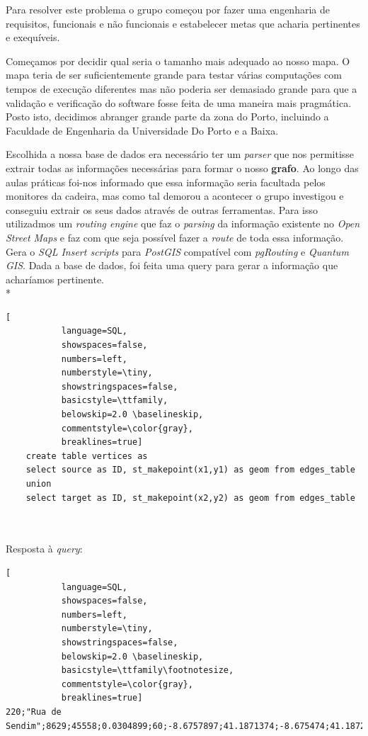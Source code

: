 \documentclass[a4paper]{article}
\begin{document}
\begin{small}

Para resolver este problema o grupo começou por fazer uma engenharia de requisitos, funcionais e não funcionais e estabelecer metas que acharia pertinentes e exequíveis.

Começamos por decidir qual seria o tamanho mais adequado ao nosso mapa. O mapa teria de ser suficientemente grande para testar várias computações com tempos de execução diferentes mas não poderia ser demasiado grande para que a validação e verificação do software fosse feita de uma maneira mais pragmática. Posto isto, decidimos abranger grande parte da zona do Porto, incluindo a Faculdade de Engenharia da Universidade Do Porto e a Baixa. 

Escolhida a nossa base de dados era necessário ter um \textit{parser} que nos permitisse extrair todas as informações necessárias para formar o nosso \textbf{grafo}. Ao longo das aulas práticas foi-nos informado que essa informação seria facultada pelos monitores da cadeira, mas como tal demorou a acontecer o grupo investigou e conseguiu extrair os seus dados através de outras ferramentas. Para isso utilizadmos um \textit{routing engine} que faz o \textit{parsing} da informação existente no \textit{Open Street Maps} e faz com que seja possível fazer a \textit{route} de toda essa informação. Gera o \textit{SQL Insert scripts} para \textit{PostGIS} compatível com \textit{pgRouting} e \textit{Quantum GIS}. Dada a base de dados, foi feita uma query para gerar a informação que acharíamos pertinente. \\*

\end{small}

\begin{lstlisting}[
           language=SQL,
           showspaces=false,
           numbers=left,
           numberstyle=\tiny,
           showstringspaces=false,
           basicstyle=\ttfamily,
           belowskip=2.0 \baselineskip,
           commentstyle=\color{gray},
           breaklines=true]
    create table vertices as 
    select source as ID, st_makepoint(x1,y1) as geom from edges_table
    union
    select target as ID, st_makepoint(x2,y2) as geom from edges_table
    
    
\end{lstlisting}

Resposta à \textit{query}:

\begin{lstlisting}[
           language=SQL,
           showspaces=false,
           numbers=left,
           numberstyle=\tiny,
           showstringspaces=false,
           belowskip=2.0 \baselineskip,
           basicstyle=\ttfamily\footnotesize,
           commentstyle=\color{gray},
           breaklines=true]
220;"Rua de Sendim";8629;45558;0.0304899;60;-8.6757897;41.1871374;-8.675474;41.1872743
        \end{lstlisting}
        
\end{document}
